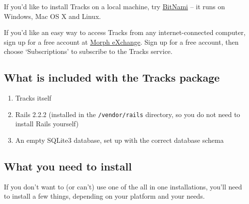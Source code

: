 \documentclass[10pt,twoside]{memoir}
\begin{document}
If you'd like to install Tracks on a local machine, try \href{http://bitnami.org/stack/tracks}{BitNami} -- it runs on Windows, Mac OS X and Linux.


If you'd like an easy way to access Tracks from any internet-connected computer, sign up for a free account at \href{http://www.morphexchange.com/}{Morph eXchange}. Sign up for a free account, then choose `Subscriptions' to subscribe to the Tracks service.


\subsection{What is included with the Tracks package}
\label{whatisincludedwiththetrackspackage}

\begin{enumerate}


\item Tracks itself

\item Rails 2.2.2 (installed in the \texttt{/vendor/rails} directory, so you do not need to install Rails yourself)

\item An empty SQLite3 database, set up with the correct database schema
\end{enumerate}

\subsection{What you need to install}
\label{whatyouneed}

If you don't want to (or can't) use one of the all in one installations, you'll need to install a few things, depending on your platform and your needs.
\end{document}
